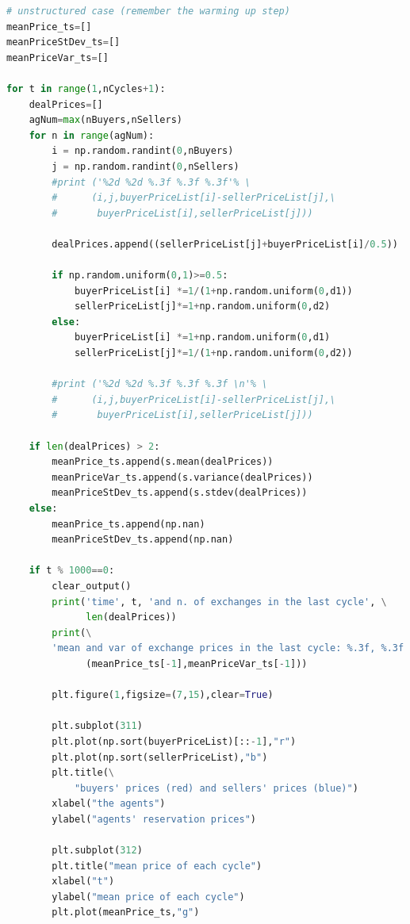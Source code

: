 \documentclass[12pt]{report}
\begin{document}
\begin{lstlisting}[language=Python, caption=The unstructured version, basicstyle=\ttfamily\footnotesize]
# unstructured case (remember the warming up step)
meanPrice_ts=[]
meanPriceStDev_ts=[]
meanPriceVar_ts=[]

for t in range(1,nCycles+1):    
    dealPrices=[]
    agNum=max(nBuyers,nSellers)
    for n in range(agNum):
        i = np.random.randint(0,nBuyers)
        j = np.random.randint(0,nSellers)
        #print ('%2d %2d %.3f %.3f %.3f'% \
        #      (i,j,buyerPriceList[i]-sellerPriceList[j],\
        #       buyerPriceList[i],sellerPriceList[j]))
        
        dealPrices.append((sellerPriceList[j]+buyerPriceList[i]/0.5))
        
        if np.random.uniform(0,1)>=0.5:    
            buyerPriceList[i] *=1/(1+np.random.uniform(0,d1))
            sellerPriceList[j]*=1+np.random.uniform(0,d2)
        else:
            buyerPriceList[i] *=1+np.random.uniform(0,d1)
            sellerPriceList[j]*=1/(1+np.random.uniform(0,d2))

        #print ('%2d %2d %.3f %.3f %.3f \n'% \
        #      (i,j,buyerPriceList[i]-sellerPriceList[j],\
        #       buyerPriceList[i],sellerPriceList[j]))
           
    if len(dealPrices) > 2:
        meanPrice_ts.append(s.mean(dealPrices))
        meanPriceVar_ts.append(s.variance(dealPrices))
        meanPriceStDev_ts.append(s.stdev(dealPrices))
    else:
        meanPrice_ts.append(np.nan)
        meanPriceStDev_ts.append(np.nan)

    if t % 1000==0:
        clear_output()
        print('time', t, 'and n. of exchanges in the last cycle', \
              len(dealPrices))
        print(\
        'mean and var of exchange prices in the last cycle: %.3f, %.3f' %\
              (meanPrice_ts[-1],meanPriceVar_ts[-1]))

        plt.figure(1,figsize=(7,15),clear=True)

        plt.subplot(311)
        plt.plot(np.sort(buyerPriceList)[::-1],"r")
        plt.plot(np.sort(sellerPriceList),"b")
        plt.title(\
            "buyers' prices (red) and sellers' prices (blue)")
        xlabel("the agents")
        ylabel("agents' reservation prices")

        plt.subplot(312)
        plt.title("mean price of each cycle")
        xlabel("t")
        ylabel("mean price of each cycle")
        plt.plot(meanPrice_ts,"g")
        

\end{lstlisting}
\end{document}
